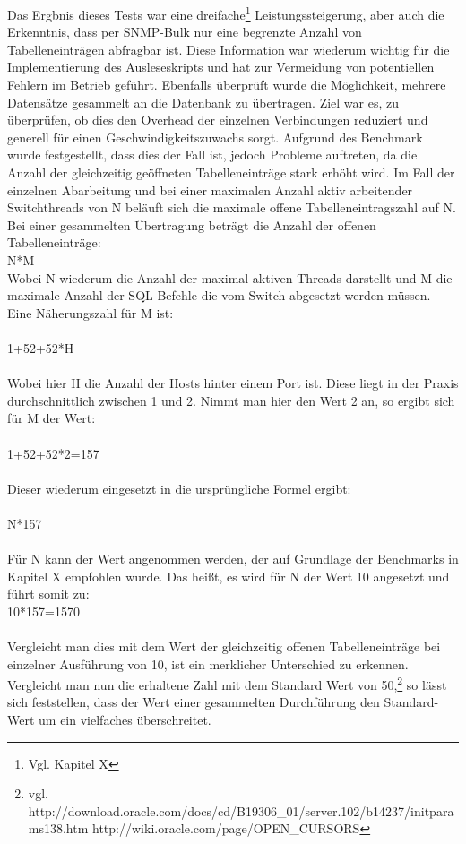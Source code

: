 Das Ergbnis dieses Tests war eine dreifache\footnote{Vgl. Kapitel X} Leistungssteigerung, aber auch die Erkenntnis, dass per SNMP-Bulk nur eine begrenzte Anzahl von Tabelleneinträgen abfragbar ist. Diese Information war wiederum wichtig für die Implementierung des Ausleseskripts und hat zur Vermeidung von potentiellen Fehlern im Betrieb geführt. Ebenfalls überprüft wurde die Möglichkeit, mehrere Datensätze gesammelt an die Datenbank zu übertragen.
Ziel war es, zu überprüfen, ob dies den Overhead der einzelnen Verbindungen reduziert und generell für einen Geschwindigkeitszuwachs sorgt. Aufgrund des Benchmark wurde festgestellt, dass dies der Fall ist, jedoch Probleme auftreten, da die Anzahl der gleichzeitig geöffneten Tabelleneinträge stark erhöht wird. Im Fall der einzelnen Abarbeitung und bei einer maximalen Anzahl aktiv arbeitender Switchthreads von N beläuft sich die maximale offene Tabelleneintragszahl auf N.
\\ Bei einer gesammelten Übertragung beträgt die Anzahl der offenen Tabelleneinträge:\\
N*M\\
Wobei N wiederum die Anzahl der maximal aktiven Threads darstellt und M die maximale Anzahl der SQL-Befehle die vom Switch abgesetzt werden müssen. Eine Näherungszahl für M ist:\\
\\
1+52+52*H\\
\\
Wobei hier H die Anzahl der Hosts hinter einem Port ist. Diese liegt in der Praxis durchschnittlich zwischen 1 und 2. Nimmt man hier den Wert 2 an, so ergibt sich für M der Wert:\\
\\
1+52+52*2=157\\
\\
Dieser wiederum eingesetzt in die ursprüngliche Formel ergibt:\\
\\
N*157\\
\\
Für N kann der Wert angenommen werden, der auf Grundlage der Benchmarks in Kapitel X empfohlen wurde.
Das heißt, es wird für N der Wert 10 angesetzt und führt somit zu:
\\
10*157=1570\\
\\
Vergleicht man dies mit dem Wert der gleichzeitig offenen Tabelleneinträge bei einzelner Ausführung von 10, ist ein merklicher Unterschied zu erkennen. Vergleicht man nun die erhaltene Zahl mit dem Standard Wert von 50,\footnote{vgl. http://download.oracle.com/docs/cd/B19306\_01/server.102/b14237/initparams138.htm  http://wiki.oracle.com/page/OPEN\_CURSORS} so lässt sich feststellen, dass der Wert einer gesammelten Durchführung den Standard-Wert um ein vielfaches überschreitet.
